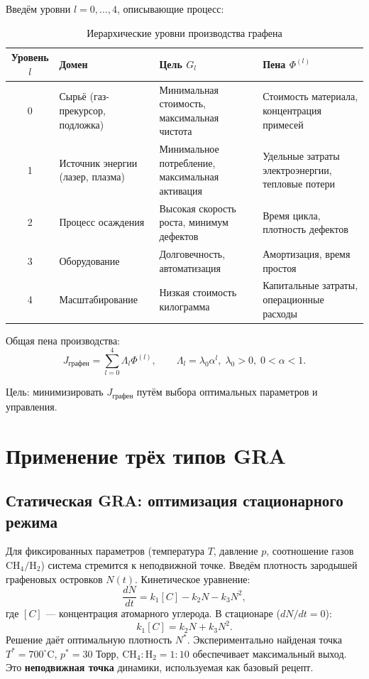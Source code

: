 \documentclass[12pt,a4paper]{article}
\begin{document}
Введём уровни \(l = 0,\dots,4\), описывающие процесс:

\begin{table}[h]
\centering
\caption{Иерархические уровни производства графена}
\label{tab:levels}
\begin{tabular}{|c|l|l|p{5cm}|}
\hline
Уровень \(l\) & Домен & Цель \(G_l\) & Пена \(\Phi^{(l)}\) \\
\hline
0 & Сырьё (газ-прекурсор, подложка) & Минимальная стоимость, максимальная чистота & Стоимость материала, концентрация примесей \\
1 & Источник энергии (лазер, плазма) & Минимальное потребление, максимальная активация & Удельные затраты электроэнергии, тепловые потери \\
2 & Процесс осаждения & Высокая скорость роста, минимум дефектов & Время цикла, плотность дефектов \\
3 & Оборудование & Долговечность, автоматизация & Амортизация, время простоя \\
4 & Масштабирование & Низкая стоимость килограмма & Капитальные затраты, операционные расходы \\
\hline
\end{tabular}
\end{table}

Общая пена производства:
\[
J_{\text{графен}} = \sum_{l=0}^{4} \Lambda_l \Phi^{(l)},\qquad \Lambda_l = \lambda_0 \alpha^l,\; \lambda_0>0,\;0<\alpha<1.
\]

Цель: минимизировать \(J_{\text{графен}}\) путём выбора оптимальных параметров и управления.

\section{Применение трёх типов GRA}

\subsection{Статическая GRA: оптимизация стационарного режима}

Для фиксированных параметров (температура \(T\), давление \(p\), соотношение газов \(\text{CH}_4/\text{H}_2\)) система стремится к неподвижной точке. Введём плотность зародышей графеновых островков \(N(t)\). Кинетическое уравнение:
\[
\frac{dN}{dt} = k_1 [C] - k_2 N - k_3 N^2,
\]
где \([C]\) — концентрация атомарного углерода. В стационаре (\(dN/dt=0\)):
\[
k_1 [C] = k_2 N + k_3 N^2.
\]
Решение даёт оптимальную плотность \(N^*\). Экспериментально найденая точка \(T^* = 700^\circ\)C, \(p^* = 30\) Торр, \(\text{CH}_4:\text{H}_2 = 1:10\) обеспечивает максимальный выход. Это \textbf{неподвижная точка} динамики, используемая как базовый рецепт.
\end{document}
